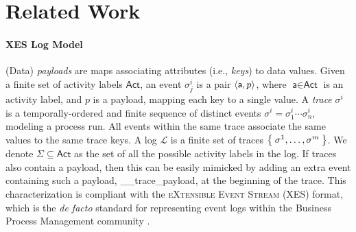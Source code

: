 \section{Related Work}


\paragraph*{XES Log Model}\label{sec:XES}


(Data) \textit{payloads} are maps  associating attributes (i.e., \textit{keys}) to data values. 
Given a finite set of activity labels $\textsf{Act}$, an event $\sigma_j^{i}$ is a pair $\Braket{\textsf{a},p}$, where $\textsf{a}\in\textsf{Act}$ is an activity label, and $p$ is a payload, mapping each key to a single value. 
A \textit{trace} $\sigma^i$ is a temporally-ordered and finite sequence of distinct events $\sigma^i=\sigma_1^i\cdots\sigma_n^i$, modeling a process run. 
All events within the same trace associate the same values to the same trace keys. 
A log $\mathcal{L}$ is a finite set of traces $\Set{\sigma^1,\dots,\sigma^m}$. We denote  $\Sigma\subseteq\textsf{Act}$ as the set of all the possible activity labels in the log. If traces also contain a payload, then this can be easily mimicked by adding an extra event containing such a payload, \textsf{\_\_trace\_payload}, at the beginning of the trace. This  characterization \cite{bpm21} is compliant with the \textsc{eXtensible Event Stream} (XES) format, which is the \textit{de facto} standard for representing event logs within the Business Process Management community \cite{XES}. 